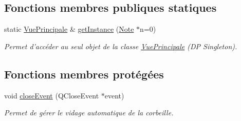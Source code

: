 \subsection*{Fonctions membres publiques statiques}
\begin{DoxyCompactItemize}
\item 
static \hyperlink{class_vue_principale}{Vue\-Principale} \& \hyperlink{class_vue_principale_ac475702859be52ac07b329663c24a56b}{get\-Instance} (\hyperlink{class_note}{Note} $\ast$n=0)
\begin{DoxyCompactList}\small\item\em Permet d'accéder au seul objet de la classe \hyperlink{class_vue_principale}{Vue\-Principale} (D\-P Singleton). \end{DoxyCompactList}\end{DoxyCompactItemize}
\subsection*{Fonctions membres protégées}
\begin{DoxyCompactItemize}
\item 
void \hyperlink{class_vue_principale_aac7af04920ca134b4fdf10f0e2693724}{close\-Event} (Q\-Close\-Event $\ast$event)
\begin{DoxyCompactList}\small\item\em Permet de gérer le vidage automatique de la corbeille. \end{DoxyCompactList}\end{DoxyCompactItemize}
